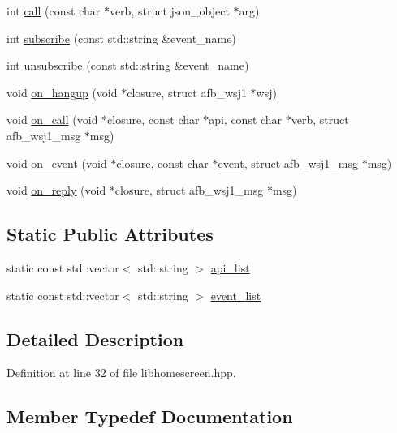\begin{DoxyCompactItemize}
\item 
int \hyperlink{class_lib_home_screen_ab5e8e8ab7d53e0f114e9e907fcbb7643}{call} (const char $\ast$verb, struct json\+\_\+object $\ast$arg)
\item 
int \hyperlink{class_lib_home_screen_aa4c189807b75d070f567967f0d690738}{subscribe} (const std\+::string \&event\+\_\+name)
\item 
int \hyperlink{class_lib_home_screen_aac03a45cbd453ba69ddb00c1016930a6}{unsubscribe} (const std\+::string \&event\+\_\+name)
\item 
void \hyperlink{class_lib_home_screen_ab1c1fa69f24b981e824dd9fb810c4b74}{on\+\_\+hangup} (void $\ast$closure, struct afb\+\_\+wsj1 $\ast$wsj)
\item 
void \hyperlink{class_lib_home_screen_a608638eb87b2772a3dcc92d8ca8f3596}{on\+\_\+call} (void $\ast$closure, const char $\ast$api, const char $\ast$verb, struct afb\+\_\+wsj1\+\_\+msg $\ast$msg)
\item 
void \hyperlink{class_lib_home_screen_a9c4885b51b43ab24a548d49fb3ab2de3}{on\+\_\+event} (void $\ast$closure, const char $\ast$\hyperlink{structevent}{event}, struct afb\+\_\+wsj1\+\_\+msg $\ast$msg)
\item 
void \hyperlink{class_lib_home_screen_a248d9648c6186287a7632ec1c75fc9c5}{on\+\_\+reply} (void $\ast$closure, struct afb\+\_\+wsj1\+\_\+msg $\ast$msg)
\end{DoxyCompactItemize}
\subsection*{Static Public Attributes}
\begin{DoxyCompactItemize}
\item 
static const std\+::vector$<$ std\+::string $>$ \hyperlink{class_lib_home_screen_a5593ff5ac78f6495ccb649904cf0ab08}{api\+\_\+list}
\item 
static const std\+::vector$<$ std\+::string $>$ \hyperlink{class_lib_home_screen_a6a6d8a4d33a006a08652e7377a4c29e9}{event\+\_\+list}
\end{DoxyCompactItemize}


\subsection{Detailed Description}


Definition at line 32 of file libhomescreen.\+hpp.



\subsection{Member Typedef Documentation}
\mbox{\label{class_lib_home_screen_a334f11f81c84c98d18284215dcaada3a}} 
